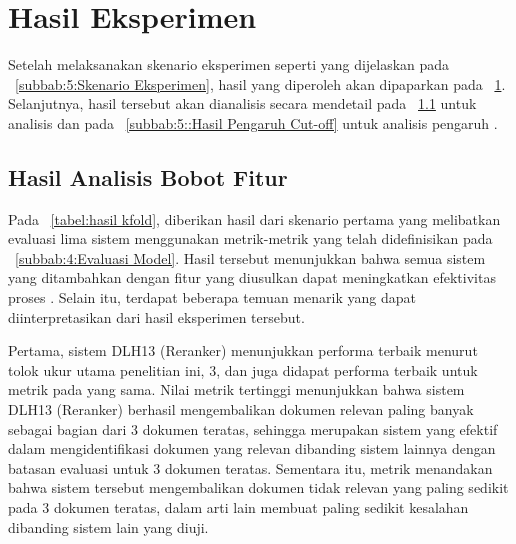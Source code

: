 \section{Hasil Eksperimen}
\label{subbab:5:Hasil Eksperimen}
Setelah melaksanakan skenario eksperimen seperti yang dijelaskan pada \subbab{}~\ref{subbab:5:Skenario Eksperimen}, hasil yang diperoleh akan dipaparkan pada \subbab{}~\ref{subbab:5:Hasil Eksperimen}. Selanjutnya, hasil tersebut akan dianalisis secara mendetail pada \subbab{}~\ref{subbab:5::Hasil Analisis Bobot Fitur} untuk analisis \feature{} \importance{} dan pada \subbab{}~\ref{subbab:5::Hasil Pengaruh Cut-off} untuk analisis pengaruh \cutoff{}.





\subsection{Hasil Analisis Bobot Fitur}
\label{subbab:5::Hasil Analisis Bobot Fitur}
Pada \tabel{}~\ref{tabel:hasil kfold}, diberikan hasil dari skenario pertama yang melibatkan evaluasi lima sistem \cascaded{} \ir{} menggunakan metrik-metrik yang telah didefinisikan pada \subbab{}~\ref{subbab:4:Evaluasi Model}. Hasil tersebut menunjukkan bahwa semua sistem \ir{} yang ditambahkan \reranker{} dengan fitur yang diusulkan dapat meningkatkan efektivitas proses \retrieval{}. Selain itu, terdapat beberapa temuan menarik yang dapat diinterpretasikan dari hasil eksperimen tersebut.

Pertama, sistem DLH13 (Reranker) menunjukkan performa terbaik menurut tolok ukur utama penelitian ini, \recall{} \cutoff{} 3, dan juga didapat performa terbaik untuk metrik \precision{} pada \cutoff{} yang sama. Nilai metrik \recall{} tertinggi menunjukkan bahwa sistem DLH13 (Reranker) berhasil mengembalikan dokumen relevan paling banyak sebagai bagian dari 3 dokumen teratas, sehingga merupakan sistem yang efektif dalam mengidentifikasi dokumen yang relevan dibanding sistem lainnya dengan batasan evaluasi untuk 3 dokumen teratas. Sementara itu, metrik \precision{} menandakan bahwa sistem tersebut mengembalikan dokumen tidak relevan yang paling sedikit pada 3 dokumen teratas, dalam arti lain membuat paling sedikit kesalahan dibanding sistem lain yang diuji.

